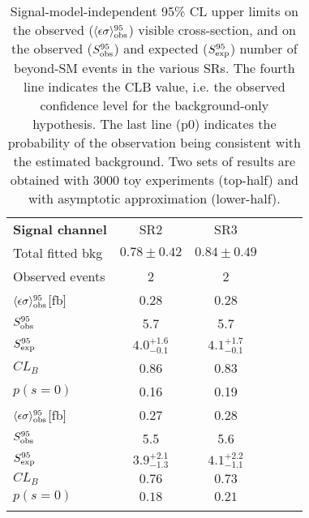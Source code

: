 
\begin{table}[h!]
  \caption[Breakdown of upper limits.]{
    Signal-model-independent 95\% CL upper limits on the observed ($\langle\epsilon{\rm \sigma}\rangle_{\rm obs}^{95}$) %
    visible cross-section, and on the observed ($S_{\rm obs}^{95}$) and expected ($S_{\rm exp}^{95}$) number of beyond-SM
    events in the various SRs. The fourth line indicates the CLB value, i.e. the observed confidence level for
    the background-only hypothesis. The last line (p0) indicates the probability of the observation being
    consistent with the estimated background. Two sets of results are obtained with 3000 toy experiments
    (top-half) and with asymptotic approximation (lower-half).}
  \begin{center}
    \setlength{\tabcolsep}{0.0pc}
    \begin{tabular*}{\textwidth}{@{\extracolsep{\fill}}lccccc}
      \noalign{\smallskip}\hline\noalign{\smallskip}
              {\bf Signal channel}                   & SR2 & SR3 \\
              \noalign{\smallskip}\hline\noalign{\smallskip}
              Total fitted bkg   &   $0.78\pm 0.42$   &  $0.84 \pm 0.49$  \\
              Observed events   &   2  &  2  \\
              \noalign{\smallskip}\hline\noalign{\smallskip}

              $\langle\epsilon{\rm \sigma}\rangle_{\rm obs}^{95}$[fb]  & 0.28  & 0.28 \\
              $S_{\rm obs}^{95}$  & 5.7 & 5.7 \\
              $S_{\rm exp}^{95}$ & ${4.0}^{+1.6}_{-0.1}$ & ${4.1}^{+1.7}_{-0.1}$ \\
              $CL_{B}$ & 0.86 & 0.83 \\
              $p(s=0)$  & 0.16 &  0.19 \\

              \noalign{\smallskip}\hline\noalign{\smallskip}

              $\langle\epsilon{\rm \sigma}\rangle_{\rm obs}^{95}$[fb]  & 0.27  & 0.28 \\
              $S_{\rm obs}^{95}$  & 5.5 & 5.6 \\
              $S_{\rm exp}^{95}$ &  ${3.9}^{+2.1}_{-1.3}$ & ${4.1}^{+2.2}_{-1.1}$ \\
              $CL_{B}$ &  $0.76$  & $0.73$ \\
              $p(s=0)$  &  $0.18$ & $0.21$ \\

              \noalign{\smallskip}\hline\noalign{\smallskip}
    \end{tabular*}
  \end{center}
  \label{tab:upperlimits}
\end{table}


